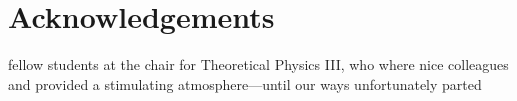 \chapter{Acknowledgements}

fellow students at the chair for Theoretical Physics III, who where nice colleagues and provided a stimulating atmosphere---until our ways unfortunately parted

